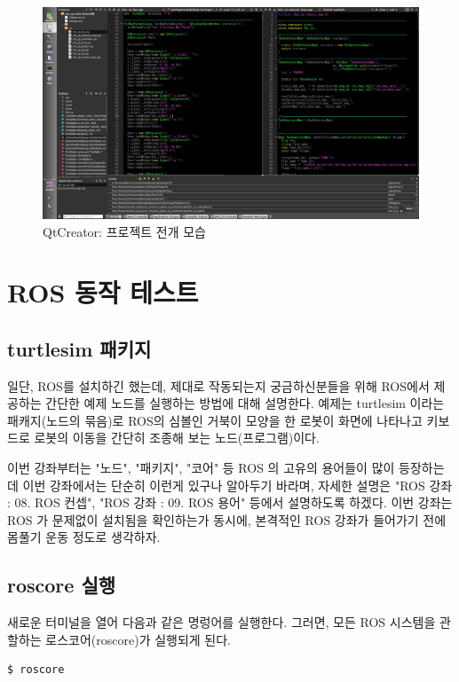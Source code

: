 \begin{figure}[h]
\centering\includegraphics[width=0.8\columnwidth]{pictures/chapter2/qtcreator3.png}
\caption{QtCreator: 프로젝트 전개 모습}
\end{figure}

\section{ROS 동작 테스트}

\subsection{turtlesim 패키지}
일단, ROS를 설치하긴 했는데, 제대로 작동되는지 궁금하신분들을 위해 ROS에서 제공하는 간단한 예제 노드를 실행하는 방법에 대해 설명한다. 예제는 turtlesim 이라는 패캐지(노드의 묶음)로 ROS의 심볼인 거북이 모양을 한 로봇이 화면에 나타나고 키보드로 로봇의 이동을 간단히 조종해 보는 노드(프로그램)이다.

이번 강좌부터는 "노드", "패키지", "코어" 등 ROS 의 고유의 용어들이 많이 등장하는데 이번 강좌에서는 단순히 이런게 있구나 알아두기 바라며, 자세한 설명은 "ROS 강좌 : 08. ROS 컨셉", "ROS 강좌 : 09. ROS 용어" 등에서 설명하도록 하겠다. 이번 강좌는 ROS 가 문제없이 설치됨을 확인하는가 동시에, 본격적인 ROS 강좌가 들어가기 전에 몸풀기 운동 정도로 생각하자.

\subsection{roscore 실행}
새로운 터미널을 열어 다음과 같은 명렁어를 실행한다. 그러면, 모든 ROS 시스템을 관할하는 로스코어(roscore)가 실행되게 된다.
\\
\begin{lstlisting}[language=ROS]
$ roscore
\end{lstlisting}

